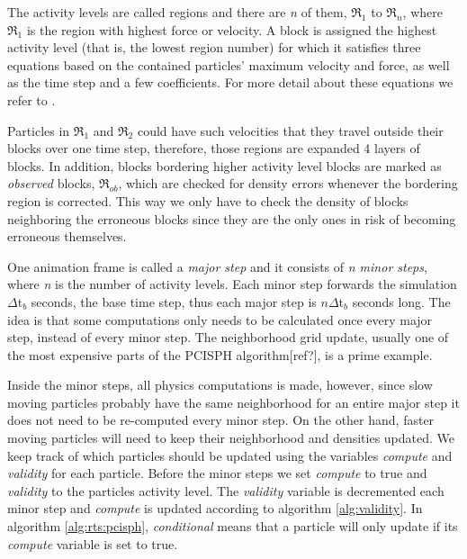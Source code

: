 \documentclass[../../main.tex]{subfiles}
\begin{document}
The activity levels are called regions and there are \textit{n} of them, $\Re_1$ to $\Re_n$, where $\Re_1$ is the region with highest force or velocity. A block is assigned the highest activity level (that is, the lowest region number) for which it satisfies three equations based on the contained particles' maximum velocity and force, as well as the time step and a few coefficients. For more detail about these equations we refer to \citet{goswami2014regional}.

Particles in $\Re_1$ and $\Re_2$ could have such velocities that they travel outside their blocks over one time step, therefore, those regions are expanded 4 layers of blocks. In addition, blocks bordering higher activity level blocks are marked as \textit{observed} blocks, $\Re_{ob}$, which are checked for density errors whenever the bordering region is corrected. This way we only have to check the density of blocks neighboring the erroneous blocks since they are the only ones in risk of becoming erroneous themselves. 

One animation frame is called a \textit{major step} and it consists of \textit{n minor steps}, where \textit{n} is the number of activity levels. Each minor step forwards the simulation $\Delta$t$_b$ seconds, the base time step, thus each major step is $n\Delta$t$_b$ seconds long. The idea is that some computations only needs to be calculated once every major step, instead of every minor step. The neighborhood grid update, usually one of the most expensive parts of the PCISPH algorithm[ref?], is a prime example. 

Inside the minor steps, all physics computations is made, however, since slow moving particles probably have the same neighborhood for an entire major step it does not need to be re-computed every minor step. On the other hand, faster moving particles will need to keep their neighborhood and densities updated. We keep track of which particles should be updated using the variables \textit{compute} and \textit{validity} for each particle. Before the minor steps we set \textit{compute} to true and \textit{validity} to the particles activity level. The \textit{validity} variable is decremented each minor step and \textit{compute} is updated according to algorithm \ref{alg:validity}. In algorithm \ref{alg:rts:pcisph}, \textit{conditional} means that a particle will only update if its \textit{compute} variable is set to true. 
\end{document}
